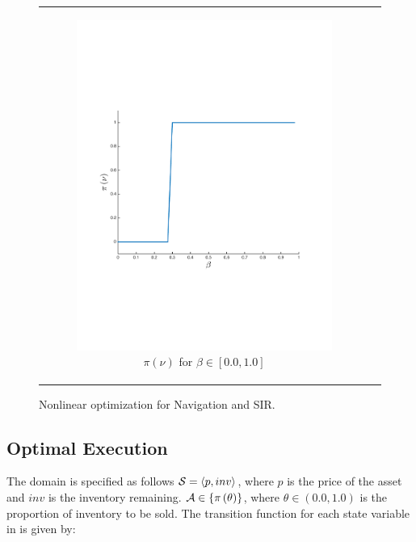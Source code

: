 \documentclass[letterpaper]{article}
\begin{document}
{\begin{figure}[]
\begin{tabular}{cc}
\begin{subfigure}{0.45\columnwidth}
                \includegraphics[width=\columnwidth,height=0.12\textheight]{images/sir_opt_new}
                \caption{{\footnotesize $ \pi(\nu) $} for {\footnotesize $ \beta \in \left[ 0.0, 1.0 \right] $}}
                \label{fig:sir_opt}
            \end{subfigure}
            \\
        \end{tabular}
        \caption{Nonlinear optimization for Navigation and SIR.}        
        \label{tab:opt_results}
    \end{figure}
}

\subsection{Optimal Execution}
\label{sec:results_oe}

The domain is specified as follows {\footnotesize $ \mathcal{S} = \left\langle p, inv \right\rangle$}, where $ p $ is the price of the asset and $ inv $ is the inventory remaining. {\footnotesize $ \mathcal{A} \in \left\lbrace \pi\left( \theta \right) \right\rbrace$}, where {\footnotesize $ \theta \in \left( 0.0, 1.0\right)$} is the proportion of inventory to be sold. The transition function {\footnotesize \Transition} for each state variable in {\footnotesize \State} is given by:
\end{document}
